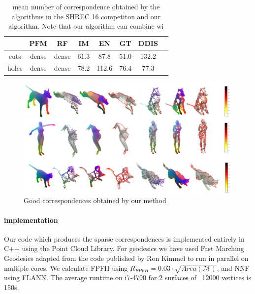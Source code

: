 \documentclass[10pt,twocolumn,letterpaper]{article}
\begin{document}
\begin{table}[h]
	\centering
	\setlength\tabcolsep{1.5pt}
	\begin{tabular}{c  c  c  c  c  c  c c} 
		\hline
		& PFM & RF & IM & EN & GT & DDIS  \\ \hline
		cuts & dense & dense & 61.3 & 87.8 & 51.0 & 132.2\\ \hline
		holes & dense & dense & 78.2 & 112.6 & 76.4 & 77.3 \\ \hline
		
	\end{tabular}
	\caption{mean number of correspondence obtained by the algorithms in the SHREC 16 competiton and our algorithm. Note that our algorithm can combine wi}
	\label{table:1}
\end{table}

\begin{figure}[htb]
	\centering

	\includegraphics[width=1\textwidth]{figures/success_1}
	\caption{Good correspondences obtained by our method}
\end{figure}



\paragraph{implementation}
Our code which produces the sparse correspondences is implemented entirely in C++ using the Point Cloud Library. For geodesics we have used  Fast Marching Geodesics adapted from the code published by Ron Kimmel to run in parallel on multiple cores. We calculate FPFH using $R_{FPFH}=0.03\cdot \sqrt{Area(\mathcal{M})}$, and NNF using FLANN. The average runtime on i7-4790 for 2 surfaces of ~12000 vertices is 150s.

{\small
	
	
}
\end{document}
